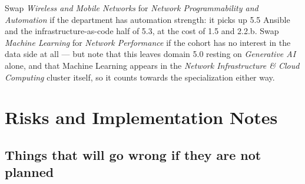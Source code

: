 \documentclass[11pt,a4paper,oneside]{report}
\begin{document}
\begin{notebox}
Swap \emph{Wireless and Mobile Networks} for \emph{Network Programmability and
Automation} if the department has automation strength: it picks up 5.5 Ansible
and the infrastructure-as-code half of 5.3, at the cost of 1.5 and 2.2.b. Swap
\emph{Machine Learning} for \emph{Network Performance} if the cohort has no
interest in the data side at all --- but note that this leaves domain 5.0 resting
on \emph{Generative AI} alone, and that Machine Learning appears in the
\emph{Network Infrastructure \& Cloud Computing} cluster itself, so it counts
towards the specialization either way.
\end{notebox}

\section{Risks and Implementation Notes}

\subsection{Things that will go wrong if they are not planned}
\end{document}

